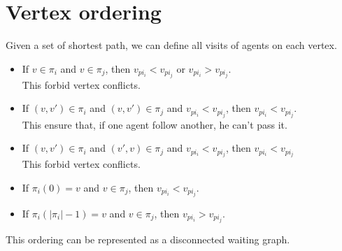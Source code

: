 \section{Vertex ordering}\label{sec:background}

Given a set of shortest path, we can define all visits of agents on each vertex.

\begin{itemize}
  \item If $v \in \pi_i$ and $v \in \pi_j$, then $v_{pi_i} < v_{pi_j}$ or $v_{pi_i} > v_{pi_j}$.
  \\ This forbid vertex conflicts.
  \item If $(v,v') \in \pi_i$ and $(v,v') \in \pi_j$ and $v_{pi_i} < v_{pi_j}$, then $v_{pi_i} < v_{pi_j}$. \\ This ensure that, if one agent follow another, he can't pass it.
  \item If $(v,v') \in \pi_i$ and $(v',v) \in \pi_j$ and $v_{pi_i} < v_{pi_j}$, then $v_{pi_i} < v_{pi_j}$ \\ This forbid vertex conflicts.
  \item If $\pi_i(0)=v$ and $v \in \pi_j$, then $v_{pi_i} < v_{pi_j}$.
  \item If $\pi_i(|\pi_i|-1)=v$ and $v \in \pi_j$, then $v_{pi_i} > v_{pi_j}$.
\end{itemize}

This ordering can be represented as a disconnected waiting graph.
